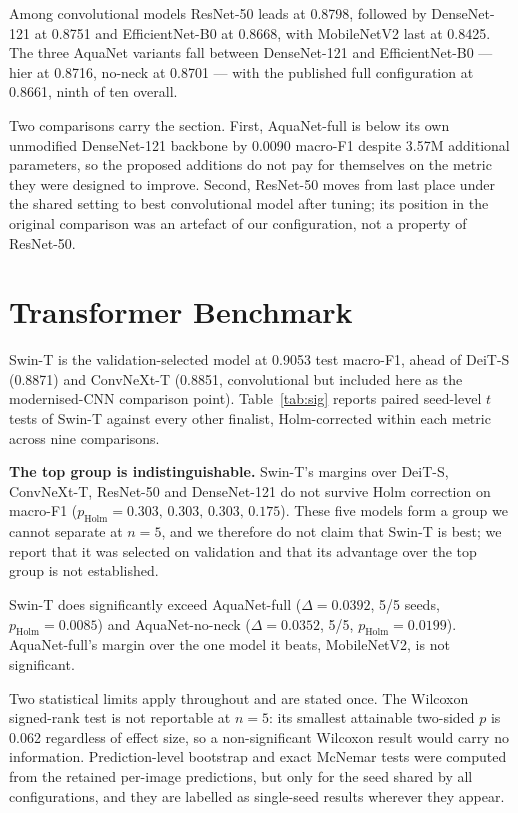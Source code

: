 \documentclass[10pt,journal]{IEEEtran}
\newcommand{\mf}{macro-F1}
\begin{document}
Among convolutional models ResNet-50 leads at 0.8798, followed by DenseNet-121 at 0.8751 and
EfficientNet-B0 at 0.8668, with MobileNetV2 last at 0.8425. The three AquaNet variants fall
between DenseNet-121 and EfficientNet-B0 --- hier at 0.8716, no-neck at 0.8701 --- with the
published full configuration at 0.8661, ninth of ten overall.

Two comparisons carry the section. First, AquaNet-full is below its own unmodified
DenseNet-121 backbone by 0.0090 \mf{} despite 3.57M additional parameters, so the proposed
additions do not pay for themselves on the metric they were designed to improve. Second,
ResNet-50 moves from last place under the shared setting to best convolutional model after
tuning; its position in the original comparison was an artefact of our configuration, not a
property of ResNet-50.

\section{Transformer Benchmark}\label{sec:transformer}
Swin-T is the validation-selected model at 0.9053 test \mf{}, ahead of DeiT-S (0.8871) and
ConvNeXt-T (0.8851, convolutional but included here as the modernised-CNN comparison point).
Table~\ref{tab:sig} reports paired seed-level $t$ tests of Swin-T against every other
finalist, Holm-corrected within each metric across nine comparisons.



\textbf{The top group is indistinguishable.} Swin-T's margins over DeiT-S, ConvNeXt-T,
ResNet-50 and DenseNet-121 do not survive Holm correction on macro-F1
($p_{\mathrm{Holm}}=0.303,\,0.303,\,0.303,\,0.175$). These five models form a group we cannot
separate at $n=5$, and we therefore do not claim that Swin-T is best; we report that it was
selected on validation and that its advantage over the top group is not established.

Swin-T does significantly exceed AquaNet-full ($\Delta=0.0392$, 5/5 seeds,
$p_{\mathrm{Holm}}=0.0085$) and AquaNet-no-neck ($\Delta=0.0352$, 5/5,
$p_{\mathrm{Holm}}=0.0199$). AquaNet-full's margin over the one model it beats, MobileNetV2,
is not significant.

Two statistical limits apply throughout and are stated once. The Wilcoxon signed-rank test is
not reportable at $n=5$: its smallest attainable two-sided $p$ is 0.062 regardless of effect
size, so a non-significant Wilcoxon result would carry no information. Prediction-level
bootstrap and exact McNemar tests were computed from the retained per-image predictions, but
only for the seed shared by all configurations, and they are labelled as single-seed results
wherever they appear.
\end{document}

